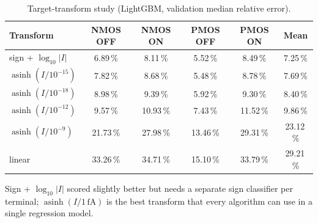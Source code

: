 \documentclass[11pt,a4paper]{article}
\newcommand{\pct}{\,\%}
\begin{document}
\begin{table}[H]
\centering
\caption{Target-transform study (LightGBM, validation median relative error).}
\begin{tabular}{lccccc}
\toprule
Transform & NMOS OFF & NMOS ON & PMOS OFF & PMOS ON & Mean \\
\midrule
sign + $\log_{10}|I|$ & 6.89\pct & 8.11\pct & 5.52\pct & 8.49\pct & 7.25\pct \\
$\operatorname{asinh}(I/10^{-15})$ & 7.82\pct & 8.68\pct & 5.48\pct & 8.78\pct & 7.69\pct \\
$\operatorname{asinh}(I/10^{-18})$ & 8.98\pct & 9.39\pct & 5.92\pct & 9.30\pct & 8.40\pct \\
$\operatorname{asinh}(I/10^{-12})$ & 9.57\pct & 10.93\pct & 7.43\pct & 11.52\pct & 9.86\pct \\
$\operatorname{asinh}(I/10^{-9})$ & 21.73\pct & 27.98\pct & 13.46\pct & 29.31\pct & 23.12\pct \\
linear & 33.26\pct & 34.71\pct & 15.10\pct & 33.79\pct & 29.21\pct \\
\bottomrule
\end{tabular}
\end{table}
Sign + $\log_{10}|I|$ scored slightly better but needs a separate sign classifier per terminal;
$\operatorname{asinh}(I/1\,\text{fA})$ is the best transform that every algorithm can use in a single
regression model.
\end{document}
